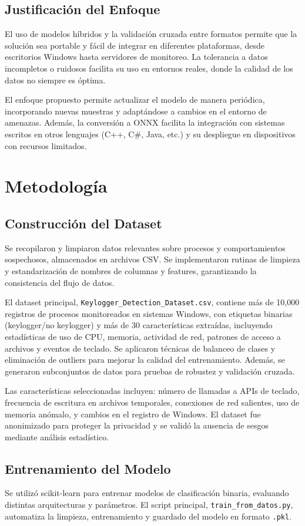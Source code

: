\documentclass{article}
\begin{document}
\subsection*{Justificación del Enfoque}
El uso de modelos híbridos y la validación cruzada entre formatos permite que la solución sea portable y fácil de integrar en diferentes plataformas, desde escritorios Windows hasta servidores de monitoreo. La tolerancia a datos incompletos o ruidosos facilita su uso en entornos reales, donde la calidad de los datos no siempre es óptima.

El enfoque propuesto permite actualizar el modelo de manera periódica, incorporando nuevas muestras y adaptándose a cambios en el entorno de amenazas. Además, la conversión a ONNX facilita la integración con sistemas escritos en otros lenguajes (C++, C#, Java, etc.) y su despliegue en dispositivos con recursos limitados.

\section{Metodología}
\subsection{Construcción del Dataset}
Se recopilaron y limpiaron datos relevantes sobre procesos y comportamientos sospechosos, almacenados en archivos CSV. Se implementaron rutinas de limpieza y estandarización de nombres de columnas y features, garantizando la consistencia del flujo de datos.

El dataset principal, \texttt{Keylogger\_Detection\_Dataset.csv}, contiene más de 10,000 registros de procesos monitoreados en sistemas Windows, con etiquetas binarias (keylogger/no keylogger) y más de 30 características extraídas, incluyendo estadísticas de uso de CPU, memoria, actividad de red, patrones de acceso a archivos y eventos de teclado. Se aplicaron técnicas de balanceo de clases y eliminación de outliers para mejorar la calidad del entrenamiento. Además, se generaron subconjuntos de datos para pruebas de robustez y validación cruzada.

Las características seleccionadas incluyen: número de llamadas a APIs de teclado, frecuencia de escritura en archivos temporales, conexiones de red salientes, uso de memoria anómalo, y cambios en el registro de Windows. El dataset fue anonimizado para proteger la privacidad y se validó la ausencia de sesgos mediante análisis estadístico.

\subsection{Entrenamiento del Modelo}
Se utilizó scikit-learn para entrenar modelos de clasificación binaria, evaluando distintas arquitecturas y parámetros. El script principal, \texttt{train_from_datos.py}, automatiza la limpieza, entrenamiento y guardado del modelo en formato \texttt{.pkl}.
\end{document}
